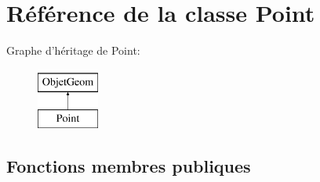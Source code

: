 \hypertarget{class_point}{\section{Référence de la classe Point}
\label{class_point}
}
Graphe d'héritage de Point\+:\begin{figure}[H]
\begin{center}
\leavevmode
\includegraphics[height=2.000000cm]{class_point}
\end{center}
\end{figure}
\subsection*{Fonctions membres publiques}

